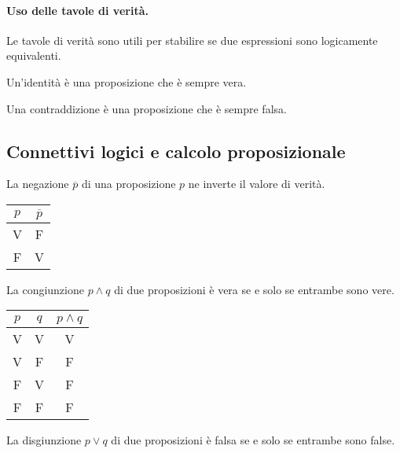 \paragraph{Uso delle tavole di verità.} Le tavole di verità sono utili per stabilire se due espressioni sono logicamente equivalenti.

\begin{definition}[Identità] Un'identità è una proposizione che è sempre vera.
\end{definition}

\begin{definition}[Contraddizione] Una contraddizione è una proposizione che è sempre falsa.
\end{definition}

\subsection{Connettivi logici e calcolo proposizionale}
\begin{definition}[Negazione] La negazione $\overline{p}$ di una proposizione $p$ ne inverte il valore di verità.
\end{definition}
\begin{center}
\begin{tabular}{|c||c|}
  \hline
  $p$ & $\overline{p}$ \\
  \hline
  V & F \\
  F & V \\
  \hline
\end{tabular}
\end{center}
\begin{definition}[Congiunzione] La congiunzione $p \land q$ di due proposizioni è vera se e solo se entrambe sono vere. 
\end{definition}
\begin{center}
\begin{tabular}{|c|c||c|}
  \hline
  $p$ & $q$ & $p\land q$\\
  \hline
  V & V & V \\
  V & F & F \\
  F & V & F \\
  F & F & F \\
  \hline
\end{tabular}
\end{center}
\begin{definition}[Disgiunzione] La disgiunzione $p \lor q$ di due proposizioni è falsa se e solo se entrambe sono false.
\end{definition}
